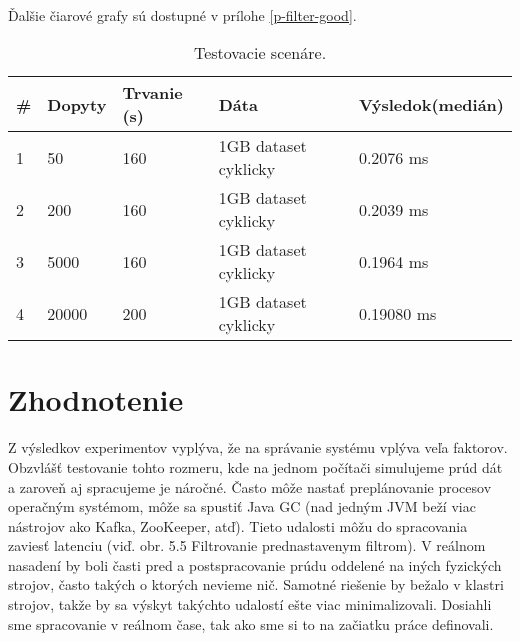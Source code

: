 \\[5pt]
Ďalšie čiarové grafy sú dostupné v prílohe \ref{p-filter-good}.
\begin{table}[h!]
    \begin{tabular}{|l|l|l|l|l|}
    \hline
    \textbf{\#} & \textbf{Dopyty} & \textbf{Trvanie (s)} & \textbf{Dáta}                   & \textbf{Výsledok\newline(medián)} \\ \hline
    1  & 50            & 160                     & 1GB dataset cyklicky  & 0.2076 ms       \\ \hline
    2  & 200           & 160                     & 1GB dataset cyklicky  & 0.2039 ms     \\ \hline
    3  & 5000          & 160                     & 1GB dataset cyklicky  & 0.1964 ms       \\ \hline
    4  & 20000         & 200                     & 1GB dataset cyklicky  & 0.19080 ms       \\ \hline
    \end{tabular}
    \caption{Testovacie scenáre.}
	\label{tab-testy2}
\end{table}

\label{fig:exp-podla-dopytu}



\section{Zhodnotenie}
Z výsledkov experimentov vyplýva, že na správanie systému vplýva veľa faktorov. Obzvlášť testovanie tohto rozmeru, kde na jednom počítači simulujeme prúd dát a zaroveň aj spracujeme je náročné. Často môže nastať preplánovanie procesov operačným systémom, môže sa spustiť Java GC (nad jedným JVM beží viac nástrojov ako Kafka, ZooKeeper, atď). Tieto udalosti môžu do spracovania zaviesť latenciu (viď. obr. 5.5 Filtrovanie prednastavenym filtrom). V reálnom nasadení by boli časti pred a postspracovanie prúdu oddelené na iných fyzických strojov, často takých o ktorých nevieme nič. Samotné riešenie by bežalo v klastri strojov, takže by sa výskyt takýchto udalostí ešte viac minimalizovali. Dosiahli sme spracovanie v  reálnom čase, tak ako sme si to na začiatku práce definovali.




















